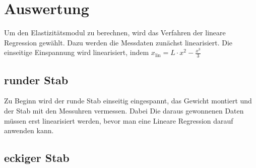 


\section{Auswertung}
Um den Elastizitätsmodul zu berechnen, wird das Verfahren der lineare Regression gewählt. Dazu werden die Messdaten 
zunächst linearisiert. Die einseitige Einspannung wird linearisiert, indem $x_\text{lin} = L \cdot x^2 - \frac{x^3}{3}$
\label{sec:Auswertung}
\subsection{runder Stab}
Zu Beginn wird der runde Stab einseitig eingespannt, das Gewicht montiert und der Stab mit den Messuhren vermessen. 
Dabei Die daraus gewonnenen Daten müssen erst linearisiert werden, bevor man eine Lineare Regression darauf anwenden kann.
 

\subsection{eckiger Stab}

